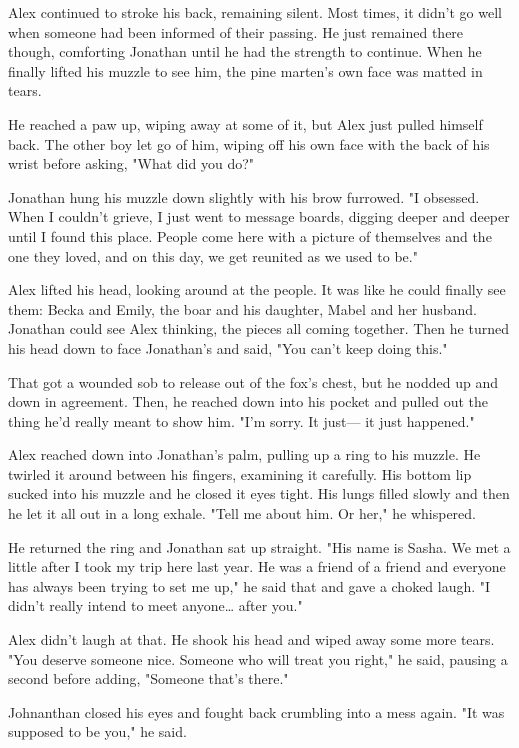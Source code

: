 Alex continued to stroke his back, remaining silent. Most times, it didn't go well when someone had been informed of their passing. He just remained there though, comforting Jonathan until he had the strength to continue. When he finally lifted his muzzle to see him, the pine marten's own face was matted in tears.

He reached a paw up, wiping away at some of it, but Alex just pulled himself back. The other boy let go of him, wiping off his own face with the back of his wrist before asking, "What did you do?"

Jonathan hung his muzzle down slightly with his brow furrowed. "I obsessed. When I couldn't grieve, I just went to message boards, digging deeper and deeper until I found this place. People come here with a picture of themselves and the one they loved, and on this day, we get reunited as we used to be."

Alex lifted his head, looking around at the people. It was like he could finally see them: Becka and Emily, the boar and his daughter, Mabel and her husband. Jonathan could see Alex thinking, the pieces all coming together. Then he turned his head down to face Jonathan's and said, "You can't keep doing this."

That got a wounded sob to release out of the fox's chest, but he nodded up and down in agreement. Then, he reached down into his pocket and pulled out the thing he'd really meant to show him. "I'm sorry. It just--- it just happened."

Alex reached down into Jonathan's palm, pulling up a ring to his muzzle. He twirled it around between his fingers, examining it carefully. His bottom lip sucked into his muzzle and he closed it eyes tight. His lungs filled slowly and then he let it all out in a long exhale. "Tell me about him. Or her," he whispered.

He returned the ring and Jonathan sat up straight. "His name is Sasha. We met a little after I took my trip here last year. He was a friend of a friend and everyone has always been trying to set me up," he said that and gave a choked laugh. "I didn't really intend to meet anyone\ldots{} after you."

Alex didn't laugh at that. He shook his head and wiped away some more tears. "You deserve someone nice. Someone who will treat you right," he said, pausing a second before adding, "Someone that's there."

Johnanthan closed his eyes and fought back crumbling into a mess again. "It was supposed to be you," he said.

